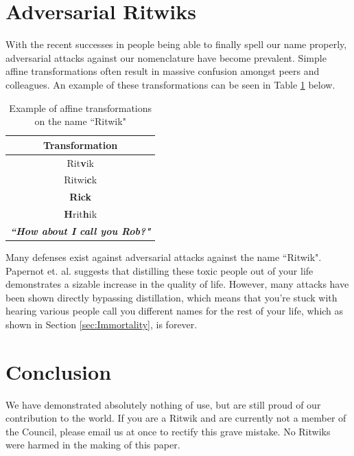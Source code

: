 \documentclass[]{article}
\begin{document}
\section{Adversarial Ritwiks}
With the recent successes in people being able to finally spell our name properly, adversarial attacks against our nomenclature have become prevalent. Simple affine transformations often result in massive confusion amongst peers and colleagues. An example of these transformations can be seen in Table \ref{table:affineadversarial} below.
\begin{table}[h]
\centering
\begin{tabular}{|c|}
	\hline 
	\textbf{Transformation}\\ 
	\hline 
	Rit\textbf{v}ik\\ 
	\hline 
	Ritwi\textbf{c}k\\
	\hline
	\textbf{Rick}\\
	\hline
	\textbf{H}rit\textbf{h}ik\\
	\hline
	\textbf{\textit{``How about I call you Rob?"}}\\
	\hline
\end{tabular}
\caption{Example of affine transformations on the name ``Ritwik"}
\label{table:affineadversarial}
\end{table}
Many defenses exist against adversarial attacks against the name ``Ritwik". Papernot et. al. \cite{Papernot} suggests that distilling these toxic people out of your life demonstrates a sizable increase in the quality of life. However, many attacks have been shown directly bypassing distillation, which means that you're stuck with hearing various people call you different names for the rest of your life, which as shown in Section \ref{sec:Immortality}, is forever.

\section{Conclusion}
We have demonstrated absolutely nothing of use, but are still proud of our contribution to the world. If you are a Ritwik and are currently not a member of the Council, please email us at once to rectify this grave mistake. No Ritwiks were harmed in the making of this paper.



\end{document}
